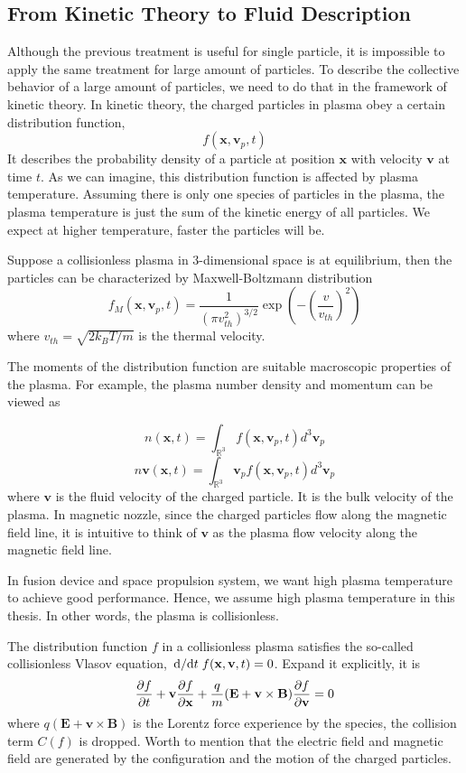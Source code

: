 \subsection{From Kinetic Theory to Fluid Description}
Although the previous treatment is useful for single particle, it is impossible to apply the same treatment for large amount of particles. To describe the collective behavior of a large amount of particles, we need to do that in the framework of kinetic theory. In kinetic theory, the charged particles in plasma obey a certain distribution function,
\[f(\mathbf{x}, \mathbf{v}_p, t)\]
It describes the probability density of a particle at position $\mathbf{x}$ with velocity $\mathbf{v}$ at time $t$. As we can imagine, this distribution function is affected by plasma temperature. Assuming there is only one species of particles in the plasma, the plasma temperature is just the sum of the kinetic energy of all particles. We expect at higher temperature, faster the particles will be.

Suppose a collisionless plasma in 3-dimensional space is at equilibrium, then the particles can be characterized by Maxwell-Boltzmann distribution
\[ f_M(\mathbf{x}, \mathbf{v}_p, t) = \frac{1}{(\pi v_{th}^2)^{3/2}} \exp(-\left(\frac{v}{v_{th}}\right)^2) \]
where $v_{th} = \sqrt{2k_BT/m}$ is the thermal velocity.

The moments of the distribution function are suitable macroscopic properties of the plasma. For example, the plasma number density and momentum can be viewed as

\[ n(\mathbf{x}, t) = \int_{\mathbb{R}^3} f(\mathbf{x}, \mathbf{v}_p, t) d^3\mathbf{v}_p \]
\[ n\mathbf{v}(\mathbf{x}, t) = \int_{\mathbb{R}^3} \mathbf{v}_p f(\mathbf{x}, \mathbf{v}_p, t) d^3\mathbf{v}_p \]
where $\mathbf{v}$ is the fluid velocity of the charged particle. It is the bulk velocity of the plasma. In magnetic nozzle, since the charged particles flow along the magnetic field line, it is intuitive to think of $\mathbf{v}$ as the plasma flow velocity along the magnetic field line.

In fusion device and space propulsion system, we want high plasma temperature to achieve good performance. Hence, we assume high plasma temperature in this thesis. In other words, the plasma is collisionless.

The distribution function $f$ in a collisionless plasma satisfies the so-called collisionless Vlasov equation, $\dv*{t} f(\mathbf{x}, \mathbf{v}, t) = 0$. Expand it explicitly, it is
\begin{equation} \label{eq:vlasov}
	\pdv{f}{t} + \mathbf{v}\pdv{f}{\mathbf{x}} + \frac{q}{m}(\mathbf{E} + \mathbf{v}\times\mathbf{B})\pdv{f}{\mathbf{v}} = 0
\end{equation}
where $q(\mathbf{E} + \mathbf{v}\times\mathbf{B})$ is the Lorentz force experience by the species, the collision term $C(f)$ is dropped. Worth to mention that the electric field and magnetic field are generated by the configuration and the motion of the charged particles.

